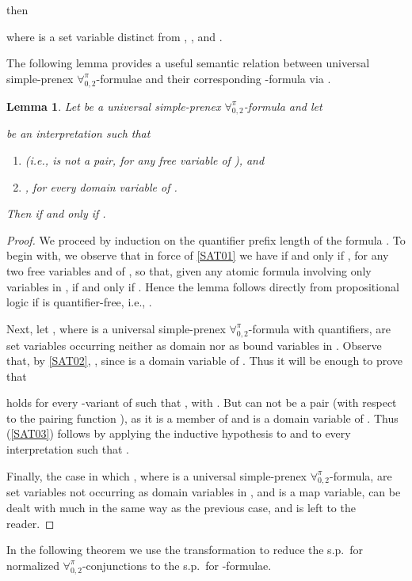 \documentclass[submission,copyright,creativecommons]{eptcs}
\newtheorem{lemma}{Lemma}
\newcommand{\Lang}{\ensuremath{\mathbf{\forall}^{\pi}_{0,2}}\xspace}
\begin{document}
then

where  is a set variable distinct from , , 
and .

The following lemma
provides a useful semantic relation between universal
simple-prenex \Lang-formulae and their corresponding
\Forallpizero-formula via .



\begin{lemma}\label{SAT0}
Let  be a universal simple-prenex \Lang-formula and let 

be an interpretation such that
\begin{enumerate}[label=(\roman{*}), ref=(\roman{*})]
  \item\label{SAT01}  (i.e.,  is not a pair, for
  any free variable  of ), and

  \item\label{SAT02} , for
  every domain variable  of .
\end{enumerate}
Then  
if and only if .
\end{lemma}
\begin{proof}
We proceed by induction on the quantifier prefix length 
of the formula .  To begin with, we observe that in force of
\ref{SAT01} we have  if and only if
, for any two free variables
 and  of , so that, given any atomic formula 
involving only variables in , 
if and only if .  Hence the lemma follows
directly from propositional logic if  is quantifier-free, i.e.,
.

Next, let , where  is a
universal simple-prenex \Lang-formula with  quantifiers,
 are set variables occurring neither as domain nor as
bound variables in .  Observe that, by
\ref{SAT02}, , since  is a
domain variable of .  Thus
it will be enough to prove that 

holds for every -variant  of  such
that , with .  But
 can not be a pair (with respect to the pairing
function ), as it is a member of  and  is
a domain variable of .  Thus (\ref{SAT03}) follows by
applying the inductive hypothesis to  and to every
interpretation  such that .

Finally, the case in which , where  is a universal simple-prenex
\Lang-formula,  are set variables not occurring as domain
variables in , and  is a map variable, can be dealt with
much in the same way as the previous case, and is left to the
reader.
\end{proof}

In the following theorem we use the transformation  to
reduce the s.p.\ for normalized \Lang-conjunctions to the s.p.\ for
\Forallpizero-formulae.
\end{document}
